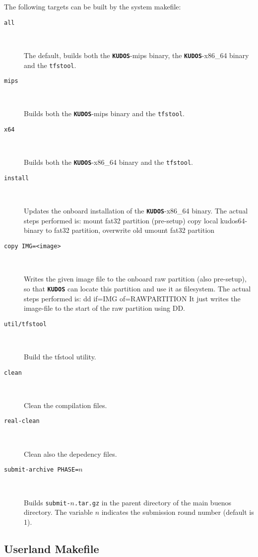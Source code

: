 \documentclass[twoside,a4paper]{report}
\newcommand{\kudos}{\texttt{\textbf{KUDOS}}}
\begin{document}
The following targets can be built by the system makefile:

\nopagebreak
\begin{description}
\item[\texttt{all}]~

The default, builds both the \kudos{}-mips binary, the
\kudos{}-x86\_64 binary and the \texttt{tfstool}.

\item[\texttt{mips}]~

Builds both the \kudos{}-mips binary and the \texttt{tfstool}.

\item[\texttt{x64}]~

Builds both the \kudos{}-x86\_64 binary and the \texttt{tfstool}.

\item[\texttt{install}]~

Updates the onboard installation of the \kudos{}-x86\_64 binary.
The actual steps performed is:
mount fat32 partition (pre-setup)
copy local kudos64-binary to fat32 partition, overwrite old
umount fat32 partition

\item[\texttt{copy IMG=<image>}]~

Writes the given image file to the onboard raw partition (also pre-setup),
so that \kudos{} can locate this partition and use it as filesystem.
The actual steps performed is:
dd if=IMG of=RAWPARTITION
It just writes the image-file to the start of the raw partition using DD.

\item[\texttt{util/tfstool}]~

Build the tfstool utility.

\item[\texttt{clean}]~

Clean the compilation files.

\item[\texttt{real-clean}]~

Clean also the depedency files.

\item[\texttt{submit-archive PHASE=$n$}]~

Builds \texttt{submit-$n$.tar.gz} in the parent directory of the main
buenos directory.  The variable $n$ indicates the submission round
number (default is 1).

\end{description}

\subsection{Userland Makefile}
\end{document}
